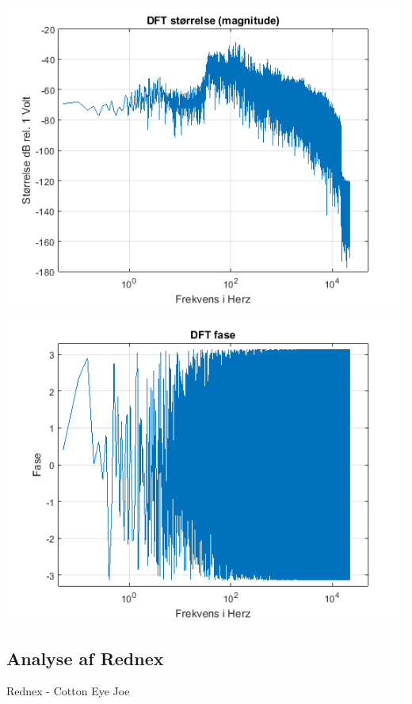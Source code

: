 \documentclass[12pt, letterpaper]{article}
\begin{document}
\begin{center}
\includegraphics[width=\textwidth]{billeder/arcticstorrelse}
\end{center}

\begin{center}
\includegraphics[width=\textwidth]{billeder/arcticfase}
\end{center}

\subsection{Analyse af Rednex}
Rednex - Cotton Eye Joe 
\end{document}
